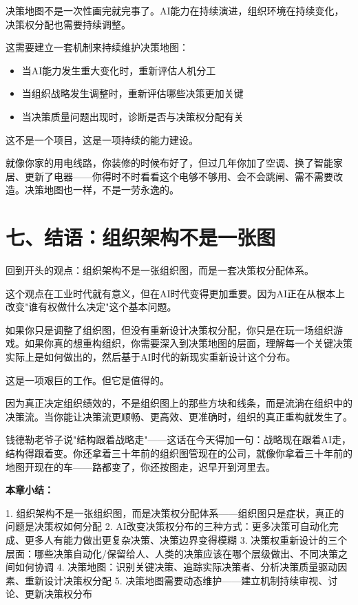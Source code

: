 决策地图不是一次性画完就完事了。AI能力在持续演进，组织环境在持续变化，决策权分配也需要持续调整。

这需要建立一套机制来持续维护决策地图：

\begin{itemize}
\item 当AI能力发生重大变化时，重新评估人机分工
\item 当组织战略发生调整时，重新评估哪些决策更加关键
\item 当决策质量问题出现时，诊断是否与决策权分配有关

\end{itemize}
这不是一个项目，这是一项持续的能力建设。

就像你家的用电线路，你装修的时候布好了，但过几年你加了空调、换了智能家居、更新了电器——你得时不时看看这个电够不够用、会不会跳闸、需不需要改造。决策地图也一样，不是一劳永逸的。

\section{七、结语：组织架构不是一张图}


回到开头的观点：组织架构不是一张组织图，而是一套决策权分配体系。

这个观点在工业时代就有意义，但在AI时代变得更加重要。因为AI正在从根本上改变"谁有权做什么决定"这个基本问题。

如果你只是调整了组织图，但没有重新设计决策权分配，你只是在玩一场组织游戏。如果你真的想重构组织，你需要深入到决策地图的层面，理解每一个关键决策实际上是如何做出的，然后基于AI时代的新现实重新设计这个分布。

这是一项艰巨的工作。但它是值得的。

因为真正决定组织绩效的，不是组织图上的那些方块和线条，而是流淌在组织中的决策流。当你能让决策流更顺畅、更高效、更准确时，组织的真正重构就发生了。

钱德勒老爷子说"结构跟着战略走"——这话在今天得加一句：战略现在跟着AI走，结构得跟着变。你还拿着三十年前的组织图管现在的公司，就像你拿着三十年前的地图开现在的车——路都变了，你还按图走，迟早开到河里去。


\textbf{本章小结：}

1. 组织架构不是一张组织图，而是决策权分配体系——组织图只是症状，真正的问题是决策权如何分配
2. AI改变决策权分布的三种方式：更多决策可自动化完成、更多人有能力做出更复杂决策、决策边界变得模糊
3. 决策权重新设计的三个层面：哪些决策自动化/保留给人、人类的决策应该在哪个层级做出、不同决策之间如何协调
4. 决策地图：识别关键决策、追踪实际决策者、分析决策质量驱动因素、重新设计决策权分配
5. 决策地图需要动态维护——建立机制持续审视、讨论、更新决策权分布
